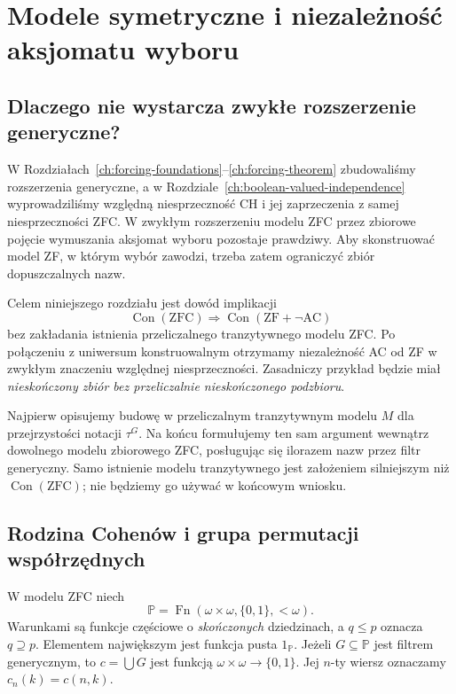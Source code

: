 \chapter{Modele symetryczne i niezależność aksjomatu wyboru}
\label{ch:symmetric-choice}

\section{Dlaczego nie wystarcza zwykłe rozszerzenie generyczne?}

W Rozdziałach~\ref{ch:forcing-foundations}--\ref{ch:forcing-theorem}
zbudowaliśmy rozszerzenia generyczne, a w
Rozdziale~\ref{ch:boolean-valued-independence}
wyprowadziliśmy względną niesprzeczność CH i jej zaprzeczenia
z samej niesprzeczności ZFC.
W zwykłym rozszerzeniu modelu ZFC przez zbiorowe pojęcie
wymuszania aksjomat wyboru pozostaje prawdziwy.
Aby skonstruować model ZF, w którym wybór zawodzi,
trzeba zatem ograniczyć zbiór dopuszczalnych nazw.

Celem niniejszego rozdziału jest dowód implikacji
\[
 \operatorname{Con}(\mathrm{ZFC})\Longrightarrow
 \operatorname{Con}(\mathrm{ZF}+\neg\mathrm{AC})
\]
bez zakładania istnienia przeliczalnego tranzytywnego modelu
ZFC. Po połączeniu z uniwersum konstruowalnym
otrzymamy niezależność AC od ZF w zwykłym
znaczeniu względnej niesprzeczności.
Zasadniczy przykład będzie miał \emph{nieskończony zbiór
bez przeliczalnie nieskończonego podzbioru}.

\begin{uwaga}
\label{rem:sym36-two-levels}
Najpierw opisujemy budowę w przeliczalnym
tranzytywnym modelu $M$ dla przejrzystości notacji
$\tau^G$. Na końcu formułujemy ten sam argument
wewnątrz dowolnego modelu zbiorowego ZFC,
posługując się ilorazem nazw przez filtr generyczny.
Samo istnienie modelu tranzytywnego jest
założeniem silniejszym niż $\operatorname{Con}(\mathrm{ZFC})$;
nie będziemy go używać w końcowym wniosku.
\end{uwaga}

\section{Rodzina Cohenów i grupa permutacji współrzędnych}

\begin{definicja}
\label{def:sym36-forcing}
W modelu ZFC niech
\[
 \mathbb P=\operatorname{Fn}
       (\omega\times\omega,\{0,1\},<\omega).
\]
Warunkami są funkcje częściowe o \emph{skończonych}
dziedzinach, a $q\le p$ oznacza $q\supseteq p$.
Elementem największym jest funkcja pusta $1_{\mathbb P}$.
Jeżeli $G\subseteq\mathbb P$ jest filtrem generycznym,
to $c=\bigcup G$ jest funkcją
$\omega\times\omega\to\{0,1\}$.
Jej $n$-ty wiersz oznaczamy
$c_n(k)=c(n,k)$.
\end{definicja}

